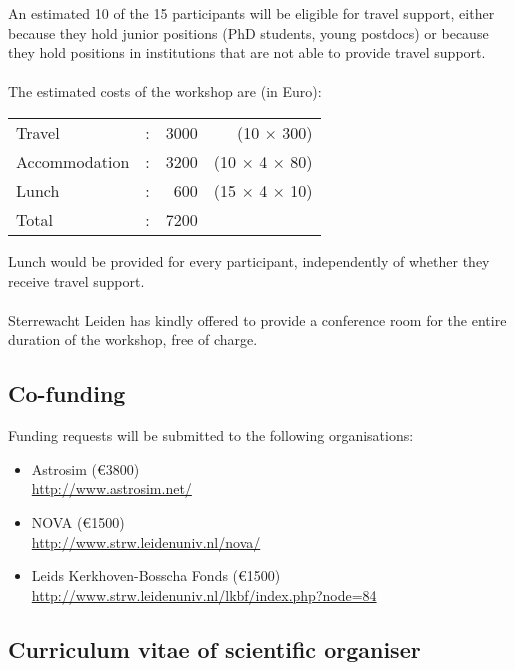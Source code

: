 \documentclass{article}
\begin{document}
An estimated 10 of the 15 participants will be eligible for travel
support, either because they hold junior positions (PhD students, young
postdocs) or because they hold positions in institutions that are not able to
provide travel support.
\\ \\
The estimated costs of the workshop are (in Euro):\\
\begin{center}
  \begin{tabular}{lcrr}
    Travel       &:& 3000 & (10 $\times$ 300) \\
    Accommodation &:& 3200 & (10 $\times$ 4 $\times$ 80) \\
    Lunch        &:&   600 & (15 $\times$ 4 $\times$ 10) \\
    \hline
    Total        &:& 7200
  \end{tabular}
\end{center}
Lunch would be provided for every participant, independently of whether
they receive travel support.
\\ \\
Sterrewacht Leiden has kindly offered to provide a conference room for the
entire duration of the workshop, free of charge.

\subsection*{Co-funding}

Funding requests will be submitted to the following organisations:
\begin{itemize}
  \item Astrosim (\euro{3800})\\
    \url{http://www.astrosim.net/}
  \item NOVA (\euro{1500})\\
    \url{http://www.strw.leidenuniv.nl/nova/}
  \item Leids Kerkhoven-Bosscha Fonds (\euro{1500})\\
    \url{http://www.strw.leidenuniv.nl/lkbf/index.php?node=84}
\end{itemize}

\subsection*{Curriculum vitae of scientific organiser}
\end{document}
